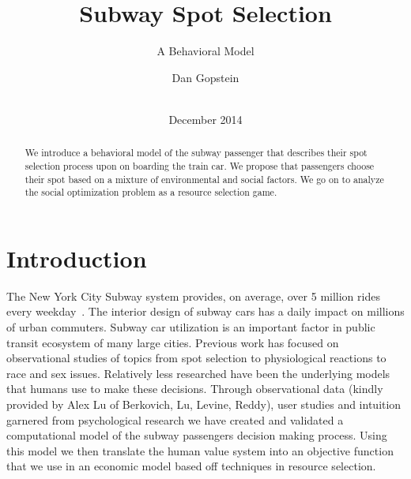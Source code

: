 \documentclass{acm_proc_article-sp}
\begin{document}
\title{Subway Spot Selection}
\subtitle{A Behavioral Model}

\author{
\alignauthor
       Dan Gopstein\\
       \\
}

\date{December 2014}



\maketitle
\begin{abstract}
We introduce a behavioral model of the subway passenger that describes their spot selection process upon on boarding the train car. We propose that passengers choose their spot based on a mixture of environmental and social factors. We go on to analyze the social optimization problem as a resource selection game.
\end{abstract}

\section{Introduction}
The New York City Subway system provides, on average, over 5 million rides every weekday~\cite{MTAFacts}. The interior design of subway cars has a daily impact on millions of urban commuters. Subway car utilization is an important factor in public transit ecosystem of many large cities. Previous work has focused on observational studies of topics from spot selection\cite{berkovich2013observed} to physiological reactions\cite{evans2007crowding} to race\cite{maines1979ecological} and sex\cite{hai1982sex} issues. Relatively less researched have been the underlying models that humans use to make these decisions. Through observational data (kindly provided by Alex Lu of Berkovich, Lu, Levine, Reddy), user studies and intuition garnered from psychological research\cite{evans2007crowding, hai1982sex, maines1979ecological} we have created and validated a computational model of the subway passengers decision making process. Using this model we then translate the human value system into an objective function that we use in an economic model based off techniques in resource selection.
\end{document}
